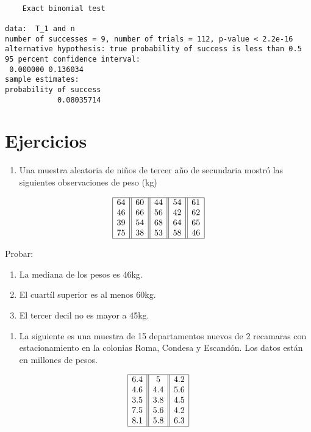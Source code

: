 \documentclass[
  a4paper,
  oneside,
  openany]{book}
\providecommand{\tightlist}{%
  \setlength{\itemsep}{0pt}\setlength{\parskip}{0pt}}
\begin{document}
\begin{verbatim}

    Exact binomial test

data:  T_1 and n
number of successes = 9, number of trials = 112, p-value < 2.2e-16
alternative hypothesis: true probability of success is less than 0.5
95 percent confidence interval:
 0.000000 0.136034
sample estimates:
probability of success 
            0.08035714 
\end{verbatim}

\hypertarget{ejercicios-1}{%
\section{Ejercicios}\label{ejercicios-1}}

\begin{enumerate}
\def\labelenumi{\arabic{enumi}.}
\tightlist
\item
  Una muestra aleatoria de niños de tercer año de secundaria mostró las siguientes observaciones de peso (kg)
\end{enumerate}

\[
\begin{array}{|c| |c| |c| |c| |c|} 
\hline
64& 60& 44& 54& 61\\
46& 66& 56& 42& 62\\
39& 54& 68& 64& 65\\
75& 38& 53& 58&46\\
\hline
\end{array}
\]

Probar:

\begin{enumerate}
\def\labelenumi{\alph{enumi})}
\item
  La mediana de los pesos es 46kg.
\item
  El cuartíl superior es al menos 60kg.
\item
  El tercer decil no es mayor a 45kg.
\end{enumerate}

\begin{enumerate}
\def\labelenumi{\arabic{enumi}.}
\setcounter{enumi}{1}
\tightlist
\item
  La siguiente es una muestra de 15 departamentos nuevos de 2 recamaras con estacionamiento en la colonias Roma, Condesa y Escandón. Los datos están en millones de pesos.
\end{enumerate}

\[
\begin{array}{|c| |c| |c|} 
\hline
6.4&    5&  4.2\\
4.6&    4.4&    5.6\\
3.5&    3.8&    4.5\\
7.5&    5.6&    4.2\\
8.1&    5.8&    6.3\\
\hline
\end{array}
\]
\end{document}
